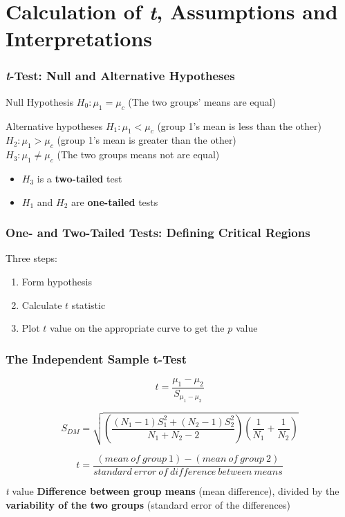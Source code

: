 \documentclass[12pt, block=fill]{beamer}
\begin{document}



\section{Calculation of \textit{t}, Assumptions and Interpretations}

\begin{frame}
  \frametitle{\textit{t}-Test: Null and Alternative Hypotheses}

  \begin{exampleblock}{Null Hypothesis}
    $H_{0}: \mu_{1} = \mu_{c}$ (The two groups' means are equal)
  \end{exampleblock}
  
  \begin{exampleblock}{Alternative hypotheses}
    $H_{1}: \mu_{1} < \mu_{c}$ (group 1's mean is less than the other) \\
    $H_{2}: \mu_{1} > \mu_{c}$ (group 1's mean is greater than the other) \\
    $H_{3}: \mu_{1} \neq \mu_{c}$ (The two groups means not are equal)
  \end{exampleblock}
  \begin{itemize}
      \item $H_{3}$ is a \textbf{two-tailed} test
      \item $H_{1}$ and $H_{2}$ are \textbf{one-tailed} tests
  \end{itemize}
\end{frame}

\begin{frame}
  \frametitle{One- and Two-Tailed Tests: Defining Critical Regions}
  
  Three steps:
  \begin{enumerate}
      \item Form hypothesis
      \item Calculate $t$ statistic
      \item Plot $t$ value on the appropriate curve to get the $p$ value
  \end{enumerate}
\end{frame}

\begin{frame}
  \frametitle{The Independent Sample t-Test}

  $$t = \frac{\mu_{1}-\mu_{2}}{S_{\mu_{1}-\mu_{2}}} $$

  $$
    S_{DM} = \sqrt{ (\frac{ (N_{1}-1)S_{1}^{2} + (N_{2}-1)S_{2}^{2} }{ N_{1}+N_{2}-2 })
                    (\frac{1}{ N_{1} } + \frac{1}{ N_{2} })
                  }
  $$

  $$
    t = \frac{(mean\ of\ group\ 1) - (mean\ of\ group\ 2)}{standard\ error\ of\ difference\ between\ means}
  $$
  
  
  \begin{exampleblock}{\textit{t} value}
    \textbf{Difference between group means} (mean difference), divided by the \textbf{variability of the two groups} (standard error of the differences)
  \end{exampleblock}

\end{frame}
\end{document}
